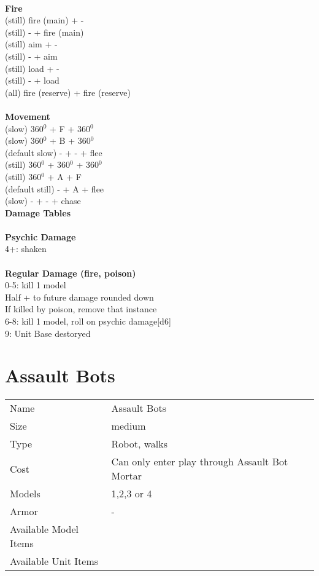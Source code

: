\ \\ {\bf Fire } \\
(still) fire (main) + - \\
(still) - + fire (main) \\
(still) aim + - \\
(still) - + aim \\
(still) load + - \\
(still) - + load \\
(all) fire (reserve) + fire (reserve) \\
\ \\ {\bf Movement } \\
(slow) 360$^0$ + F + 360$^0$ \\
(slow) 360$^0$ + B + 360$^0$ \\
(default slow) - + - + flee \\
(still) 360$^0$ + 360$^0$ + 360$^0$ \\
(still) 360$^0$ + A + F \\
(default still) - + A + flee \\
(slow) - + - + chase \\



{\bf Damage Tables} \\
\ \\ {\bf Psychic Damage } \\
4+: shaken \\
\ \\ {\bf Regular Damage (fire, poison) } \\
0-5: kill 1 model\\ Half + to future damage rounded down\\If killed by poison, remove that instance \\
6-8: kill 1 model, roll on psychic damage[d6] \\
9: Unit Base destoryed \\









\pagebreak

\section{ Assault Bots }

\begin{tabular}{ll}
  Name & Assault Bots \\
  Size & medium\\
  Type & Robot, walks\\
  Cost & Can only enter play through Assault Bot Mortar\\
  Models & 1,2,3 or 4\\
  Armor & -\\
  Available Model Items &  \\
  Available Unit Items &  \\
\end{tabular}

